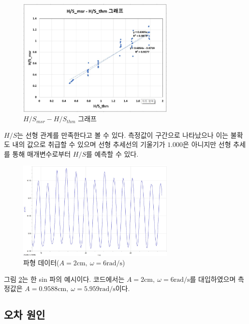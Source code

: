 \begin{figure}[H]
    \centering
    \includegraphics[width=0.70\textwidth]{images/Experiment(H.S_thm-H.S_msr).jpg}
    \caption{$H/S_{msr} - H/S_{thm}$ 그래프}
    \label{H/S Graph}
\end{figure}

$H/S$는 선형 관계를 만족한다고 볼 수 있다. 측정값이 구간으로 나타났으나 이는 불확도 내의 값으로 취급할 수 있으며 선형 추세선의 기울기가 $1.000$은 아니지만 선형 추세를 통해 매개변수로부터 $H/S$를 예측할 수 있다.

\begin{figure}[H]
    \centering
    \includegraphics[width=0.70\textwidth]{images/Wave(omega=6,A=2).jpg}
    \caption{파형 데이터($A=2\mathrm{cm},~\omega=6\mathrm{rad/s}$)}
    \label{Example Wave Data}
\end{figure}

그림 \ref{Example Wave Data}는 한 sin 파의 예시이다. 코드에서는 $A=2\mathrm{cm},~\omega=6\mathrm{rad/s}$를 대입하였으며 측정값은 $A=0.9588\mathrm{cm},~\omega=5.959\mathrm{rad/s}$이다. 

\subsection{오차 원인}

